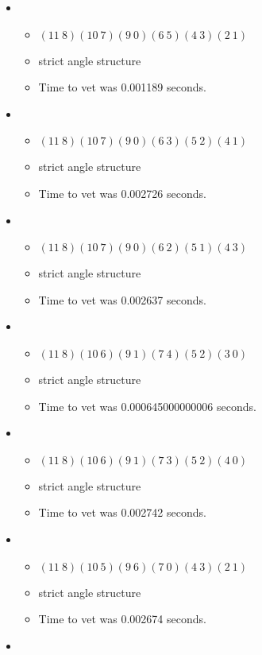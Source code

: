 \documentclass{article}
\begin{document}
\begin{itemize}
\begin{itemize}
\end{itemize}
\item \begin{itemize}
      \item $(11\ 8)(10\ 7)(9\ 0)(6\ 5)(4\ 3)(2\ 1)$
      \item strict angle structure
      \item Time to vet was 0.001189 seconds.
\end{itemize}
\item \begin{itemize}
      \item $(11\ 8)(10\ 7)(9\ 0)(6\ 3)(5\ 2)(4\ 1)$
      \item strict angle structure
      \item Time to vet was 0.002726 seconds.
\end{itemize}
\item \begin{itemize}
      \item $(11\ 8)(10\ 7)(9\ 0)(6\ 2)(5\ 1)(4\ 3)$
      \item strict angle structure
      \item Time to vet was 0.002637 seconds.
\end{itemize}
\item \begin{itemize}
      \item $(11\ 8)(10\ 6)(9\ 1)(7\ 4)(5\ 2)(3\ 0)$
      \item strict angle structure
      \item Time to vet was 0.000645000000006 seconds.
\end{itemize}
\item \begin{itemize}
      \item $(11\ 8)(10\ 6)(9\ 1)(7\ 3)(5\ 2)(4\ 0)$
      \item strict angle structure
      \item Time to vet was 0.002742 seconds.
\end{itemize}
\item \begin{itemize}
      \item $(11\ 8)(10\ 5)(9\ 6)(7\ 0)(4\ 3)(2\ 1)$
      \item strict angle structure
      \item Time to vet was 0.002674 seconds.
\end{itemize}
\item \begin{itemize}

\end{itemize}
\end{itemize}
\end{document}

